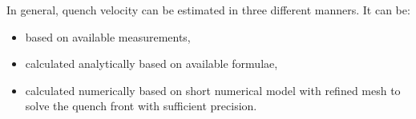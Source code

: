 In general, quench velocity can be estimated in three different manners. It can be:
\begin{itemize}
\item based on available measurements,
\item calculated analytically based on available formulae,
\item calculated numerically based on short numerical model with refined mesh to solve the quench front with sufficient precision.
\end{itemize}